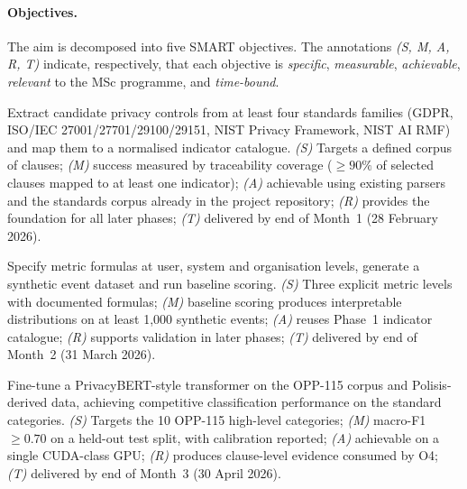 \documentclass[12pt,a4paper,titlepage]{article}
\begin{document}
\paragraph{Objectives.} The aim is decomposed into five SMART objectives. The annotations \emph{(S, M, A, R, T)} indicate, respectively, that each objective is \emph{specific}, \emph{measurable}, \emph{achievable}, \emph{relevant} to the MSc programme, and \emph{time-bound}.

\begin{description}[leftmargin=1.6em,style=nextline]
    \item[\textbf{O1 -- Standards-to-metrics mapping.}]
        Extract candidate privacy controls from at least four standards families (GDPR, ISO/IEC 27001/27701/29100/29151, NIST Privacy Framework, NIST AI RMF) and map them to a normalised indicator catalogue.
        \emph{(S)} Targets a defined corpus of clauses; \emph{(M)} success measured by traceability coverage (\(\geq 90\%\) of selected clauses mapped to at least one indicator); \emph{(A)} achievable using existing parsers and the standards corpus already in the project repository; \emph{(R)} provides the foundation for all later phases; \emph{(T)} delivered by end of Month~1 (28 February 2026).

    \item[\textbf{O2 -- Multi-level metric definition and synthetic data.}]
        Specify metric formulas at user, system and organisation levels, generate a synthetic event dataset and run baseline scoring.
        \emph{(S)} Three explicit metric levels with documented formulas; \emph{(M)} baseline scoring produces interpretable distributions on at least 1{,}000 synthetic events; \emph{(A)} reuses Phase~1 indicator catalogue; \emph{(R)} supports validation in later phases; \emph{(T)} delivered by end of Month~2 (31 March 2026).

    \item[\textbf{O3 -- Clause classification model.}]
        Fine-tune a PrivacyBERT-style transformer on the OPP-115 corpus \parencite{wilson2016opp115, opp115_dataset} and Polisis-derived data, achieving competitive classification performance on the standard categories.
        \emph{(S)} Targets the 10 OPP-115 high-level categories; \emph{(M)} macro-F1 \(\geq 0.70\) on a held-out test split, with calibration reported; \emph{(A)} achievable on a single CUDA-class GPU; \emph{(R)} produces clause-level evidence consumed by O4; \emph{(T)} delivered by end of Month~3 (30 April 2026).


\end{description}
\end{document}
